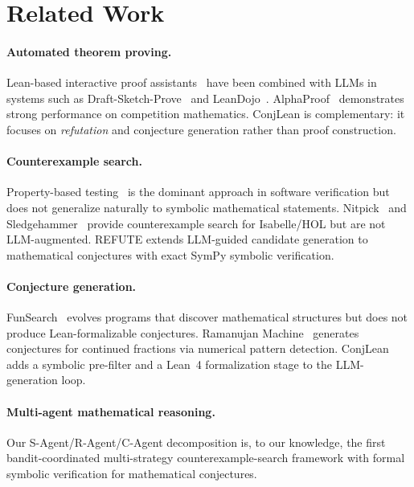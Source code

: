 \section{Related Work}
\label{sec:related}

\paragraph{Automated theorem proving.}
Lean-based interactive proof assistants~\citep{moura2021lean4} have been
combined with LLMs in systems such as
Draft-Sketch-Prove~\citep{jiang2023draft} and
LeanDojo~\citep{yang2023leandojo}.
AlphaProof~\citep{alphageometry2024} demonstrates strong performance on
competition mathematics.
ConjLean is complementary: it focuses on \emph{refutation} and conjecture
generation rather than proof construction.

\paragraph{Counterexample search.}
Property-based testing~\citep{claessen2000quickcheck} is the dominant
approach in software verification but does not generalize naturally to
symbolic mathematical statements.
Nitpick~\citep{blanchette2010nitpick} and
Sledgehammer~\citep{bohme2010sledgehammer} provide counterexample search for
Isabelle/HOL but are not LLM-augmented.
REFUTE extends LLM-guided candidate generation to mathematical conjectures
with exact SymPy symbolic verification.

\paragraph{Conjecture generation.}
FunSearch~\citep{romera2024funsearch} evolves programs that discover
mathematical structures but does not produce Lean-formalizable conjectures.
Ramanujan Machine~\citep{raayoni2021ramanujan} generates conjectures for
continued fractions via numerical pattern detection.
ConjLean adds a symbolic pre-filter and a Lean~4 formalization stage to the
LLM-generation loop.

\paragraph{Multi-agent mathematical reasoning.}
Our S-Agent/R-Agent/C-Agent decomposition is, to our knowledge, the first
bandit-coordinated multi-strategy counterexample-search framework with
formal symbolic verification for mathematical conjectures.
